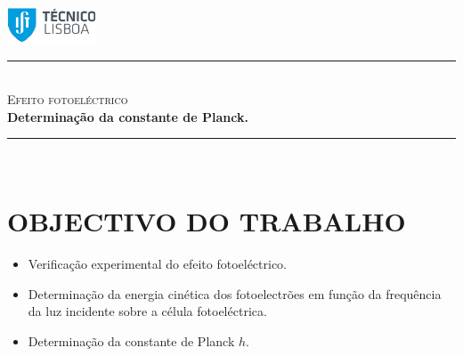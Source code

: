 \documentclass[a4paper,12pt]{article}  %
\author{Prof. Bernardo B. Carvalho}
\date{ Setembro  2015}
\newcommand{\HRule}{\rule{\linewidth}{0.5mm}}
\begin{document}
 

	\includegraphics[width=0.2\textwidth]{../../logo-ist}%

	\HRule \\[0.5cm]
	{ \huge \sf  \textsc{Efeito fotoeléctrico}} \\[0.4cm] %
	{ \large \bfseries Determinação da constante de Planck.}\\
	\HRule \\%

\section{\sf OBJECTIVO DO TRABALHO}
\begin{itemize}
\item Verificação experimental do efeito fotoeléctrico.
\item Determinação da energia cinética dos fotoelectrões em função da frequência da luz incidente sobre a célula fotoeléctrica.
\item  Determinação da constante de Planck $h$.
\end{itemize}
\end{document}
